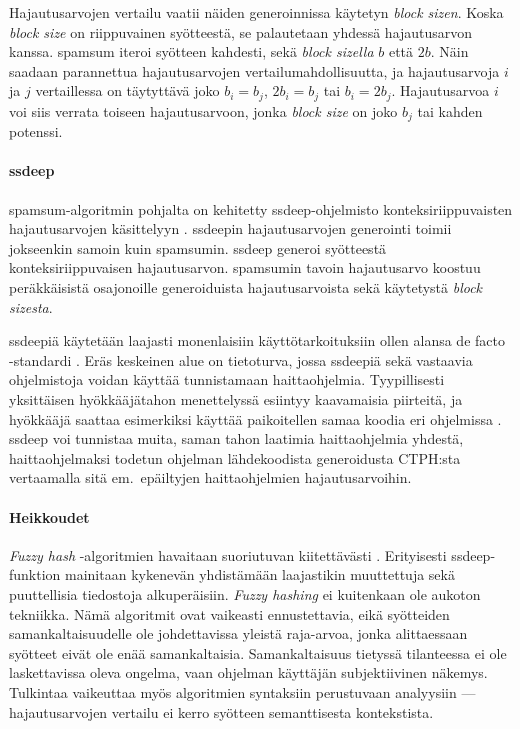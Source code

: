 \documentclass[12pt, a4paper]{article}
\begin{document}
	Hajautusarvojen vertailu vaatii näiden generoinnissa käytetyn
	\textit{block sizen}. Koska \textit{block size} on riippuvainen syötteestä,
	se palautetaan yhdessä hajautusarvon kanssa. spamsum iteroi
	syötteen kahdesti, sekä \textit{block sizella} $b$ että $2b$.
	Näin saadaan parannettua hajautusarvojen vertailumahdollisuutta, ja
	hajautusarvoja $i$ ja $j$ vertaillessa on täytyttävä joko
	$b_i = b_j$, $2b_i = b_j$ tai $b_i = 2b_j$. Hajautusarvoa $i$ voi
	siis verrata toiseen hajautusarvoon, jonka \textit{block size} on joko $b_j$ tai kahden potenssi.

	\paragraph{ssdeep}
	spamsum-algoritmin pohjalta on kehitetty ssdeep-ohjelmisto
	konteksiriippuvaisten hajautusarvojen käsittelyyn \parencite{SSDEEP}. ssdeepin
	hajautusarvojen generointi toimii jokseenkin samoin kuin
	spamsumin. ssdeep generoi syötteestä konteksiriippuvaisen
	hajautusarvon. spamsumin tavoin
	hajautusarvo koostuu peräkkäisistä osajonoille generoiduista
	hajautusarvoista sekä käytetystä \textit{block sizesta}.

	ssdeepiä käytetään laajasti monenlaisiin käyttötarkoituksiin
	ollen alansa de facto -standardi \parencite{SSDEEP}.
	Eräs keskeinen alue on tietoturva, jossa ssdeepiä
	sekä vastaavia ohjelmistoja voidan käyttää tunnistamaan
	haittaohjelmia. Tyypillisesti yksittäisen hyökkääjätahon
	menettelyssä esiintyy kaavamaisia piirteitä, ja hyökkääjä
	saattaa esimerkiksi käyttää paikoitellen samaa koodia eri
	ohjelmissa \parencite{RANSO}. ssdeep voi tunnistaa muita, saman tahon laatimia
	haittaohjelmia yhdestä, haittaohjelmaksi todetun ohjelman
	lähdekoodista generoidusta CTPH:sta vertaamalla sitä
	em.\ epäiltyjen haittaohjelmien hajautusarvoihin.

	\paragraph{Heikkoudet}
	\textit{Fuzzy hash} -algoritmien havaitaan suoriutuvan kiitettävästi \parencite{RANSO}.
	Erityisesti ssdeep-funktion mainitaan kykenevän yhdistämään laajastikin
	muuttettuja sekä puuttellisia tiedostoja alkuperäisiin. \textit{Fuzzy hashing} ei
	kuitenkaan ole aukoton tekniikka. Nämä algoritmit ovat vaikeasti
	ennustettavia, eikä syötteiden samankaltaisuudelle ole johdettavissa
	yleistä raja-arvoa, jonka alittaessaan syötteet eivät ole enää samankaltaisia.
	Samankaltaisuus tietyssä tilanteessa ei ole laskettavissa oleva ongelma,
	vaan ohjelman käyttäjän subjektiivinen näkemys.
	Tulkintaa vaikeuttaa myös algoritmien syntaksiin perustuvaan analyysiin
	--- hajautusarvojen vertailu ei kerro syötteen semanttisesta kontekstista.
\end{document}
